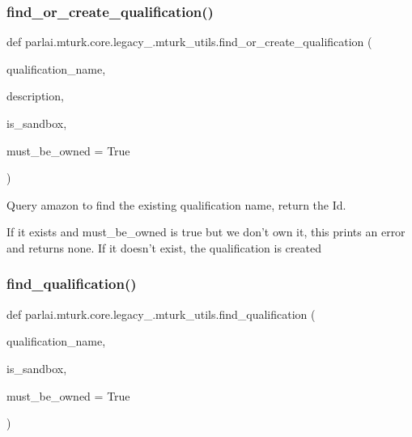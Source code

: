 \subsubsection{\texorpdfstring{find\+\_\+or\+\_\+create\+\_\+qualification()}{find\_or\_create\_qualification()}}
{\footnotesize\ttfamily def parlai.\+mturk.\+core.\+legacy\+\_.\+mturk\+\_\+utils.\+find\+\_\+or\+\_\+create\+\_\+qualification (\begin{DoxyParamCaption}\item[{}]{qualification\+\_\+name,  }\item[{}]{description,  }\item[{}]{is\+\_\+sandbox,  }\item[{}]{must\+\_\+be\+\_\+owned = {\ttfamily True} }\end{DoxyParamCaption})}

\begin{DoxyVerb}Query amazon to find the existing qualification name, return the Id.

If it exists and must_be_owned is true but we don't own it, this prints an error and
returns none. If it doesn't exist, the qualification is created
\end{DoxyVerb}
 \mbox{\label{namespaceparlai_1_1mturk_1_1core_1_1legacy__2018_1_1mturk__utils_ad152f1d9ea255ea9f365695f56e0cc5f}} 
\subsubsection{\texorpdfstring{find\+\_\+qualification()}{find\_qualification()}}
{\footnotesize\ttfamily def parlai.\+mturk.\+core.\+legacy\+\_.\+mturk\+\_\+utils.\+find\+\_\+qualification (\begin{DoxyParamCaption}\item[{}]{qualification\+\_\+name,  }\item[{}]{is\+\_\+sandbox,  }\item[{}]{must\+\_\+be\+\_\+owned = {\ttfamily True} }\end{DoxyParamCaption})}

